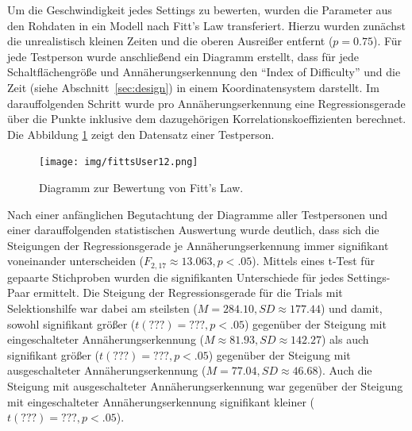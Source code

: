 \documentclass[12pt,bibliography=totocnumbered,listof=totocnumbered,abstracton]{scrreprt}
\begin{document}
Um die Geschwindigkeit jedes Settings zu bewerten, wurden die Parameter aus den Rohdaten in ein Modell nach Fitt's Law transferiert. Hierzu wurden zunächst die unrealistisch kleinen Zeiten und die oberen Ausreißer entfernt ($p = 0.75$). Für jede Testperson wurde anschließend ein Diagramm erstellt, dass für jede Schaltflächengröße und Annäherungserkennung den "`Index of Difficulty"' und die Zeit (siehe Abschnitt~\ref{sec:design}) in einem Koordinatensystem darstellt. Im darauffolgenden Schritt wurde pro Annäherungserkennung eine Regressionsgerade über die Punkte inklusive dem dazugehörigen Korrelationskoeffizienten berechnet. Die Abbildung \ref{ergebnistest2fitts} zeigt den Datensatz einer Testperson.
\begin{figure}
\centering
\texttt{[image: img/fittsUser12.png]}
\caption{Diagramm zur Bewertung von Fitt's Law.}
\label{ergebnistest2fitts}
\end{figure}
Nach einer anfänglichen Begutachtung der Diagramme aller Testpersonen und einer darauffolgenden statistischen Auswertung wurde deutlich, dass sich die Steigungen der Regressionsgerade je Annäherungserkennung immer signifikant voneinander unterscheiden ($F_{2,17}\approx 13.063, p < .05$). Mittels eines t-Test für gepaarte Stichproben wurden die signifikanten Unterschiede für jedes Settings-Paar ermittelt. Die Steigung der Regressionsgerade für die Trials mit Selektionshilfe war dabei am steilsten ($M = 284.10, SD \approx 177.44$) und damit, sowohl signifikant größer ($t(???) =??? , p < .05$) gegenüber der Steigung mit eingeschalteter Annäherungserkennung ($M \approx 81.93, SD \approx 142.27$) als auch signifikant größer ($t(???) =??? , p < .05$) gegenüber der Steigung mit ausgeschalteter Annäherungserkennung ($M = 77.04, SD \approx 46.68$). Auch die Steigung mit ausgeschalteter Annäherungserkennung war gegenüber der Steigung mit eingeschalteter Annäherungserkennung signifikant kleiner ($t(???) =??? , p < .05$).
\end{document}
